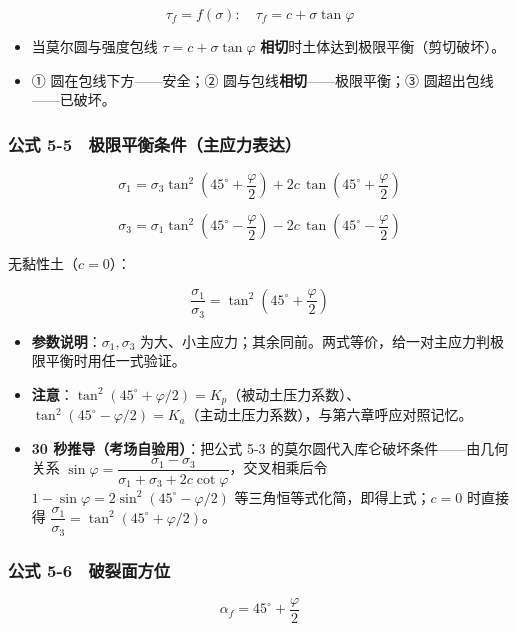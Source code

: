\documentclass[
]{article}
\providecommand{\tightlist}{%
  \setlength{\itemsep}{0pt}\setlength{\parskip}{0pt}}
\begin{document}
\[\tau_f=f(\sigma):\quad \tau_f=c+\sigma\tan\varphi\]

\begin{itemize}
\tightlist
\item
  当莫尔圆与强度包线 \(\tau=c+\sigma\tan\varphi\)
  \textbf{相切}时土体达到极限平衡（剪切破坏）。
\item
  ① 圆在包线下方------安全；② 圆与包线\textbf{相切}------极限平衡；③
  圆超出包线------已破坏。
\end{itemize}

\subsubsection{公式
5-5　极限平衡条件（主应力表达）}\label{ux516cux5f0f-5-5-ux6781ux9650ux5e73ux8861ux6761ux4ef6ux4e3bux5e94ux529bux8868ux8fbe}

\[\sigma_1=\sigma_3\tan^2\left(45^{\circ}+\frac{\varphi}{2}\right)+2c\,\tan\left(45^{\circ}+\frac{\varphi}{2}\right)\]

\[\sigma_3=\sigma_1\tan^2\left(45^{\circ}-\frac{\varphi}{2}\right)-2c\,\tan\left(45^{\circ}-\frac{\varphi}{2}\right)\]

无黏性土（\(c=0\)）：

\[\frac{\sigma_1}{\sigma_3}=\tan^2\left(45^{\circ}+\frac{\varphi}{2}\right)\]

\begin{itemize}
\tightlist
\item
  \textbf{参数说明}：\(\sigma_1,\sigma_3\)
  为大、小主应力；其余同前。两式等价，给一对主应力判极限平衡时用任一式验证。
\item
  \textbf{注意}：\(\tan^2(45^{\circ}+\varphi/2)=K_p\)（被动土压力系数）、\(\tan^2(45^{\circ}-\varphi/2)=K_a\)（主动土压力系数），与第六章呼应对照记忆。
\item
  \textbf{30 秒推导（考场自验用）}：把公式 5-3
  的莫尔圆代入库仑破坏条件------由几何关系
  \(\sin\varphi=\dfrac{\sigma_1-\sigma_3}{\sigma_1+\sigma_3+2c\cot\varphi}\)，交叉相乘后令
  \(1-\sin\varphi=2\sin^2(45^{\circ}-\varphi/2)\)
  等三角恒等式化简，即得上式；\(c=0\) 时直接得
  \(\dfrac{\sigma_1}{\sigma_3}=\tan^2(45^{\circ}+\varphi/2)\)。
\end{itemize}

\subsubsection{公式
5-6　破裂面方位}\label{ux516cux5f0f-5-6-ux7834ux88c2ux9762ux65b9ux4f4d}

\[\alpha_f=45^{\circ}+\frac{\varphi}{2}\]
\end{document}
